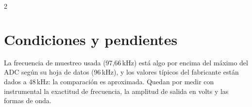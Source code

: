 \documentclass[a4paper,10pt]{article}
\begin{document}
\begin{multicols}{2}
\section{Condiciones y pendientes}
La frecuencia de muestreo usada (97,66\,kHz) está algo por encima del máximo del ADC según su hoja de
datos (96\,kHz), y los valores típicos del fabricante están dados a 48\,kHz: la comparación es
aproximada. Quedan por medir con instrumental la exactitud de frecuencia, la amplitud de salida en
volts y las formas de onda.

\end{multicols}
\end{document}
